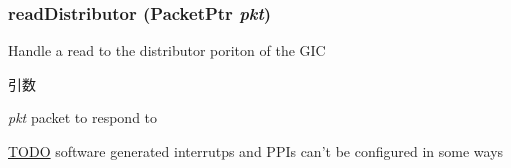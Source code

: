 \hypertarget{classPl390_a4eccad5b19d64abe6178573f999b2b3b}{
\subsubsection[{readDistributor}]{ readDistributor ({\bf PacketPtr} {\em pkt})}}
\label{classPl390_a4eccad5b19d64abe6178573f999b2b3b}
Handle a read to the distributor poriton of the GIC 
\begin{DoxyParams}{引数}
\item[{\em pkt}]packet to respond to \end{DoxyParams}


\begin{Desc}
\item[\hyperlink{todo__todo000053}{TODO}]software generated interrutps and PPIs can't be configured in some ways \end{Desc}



